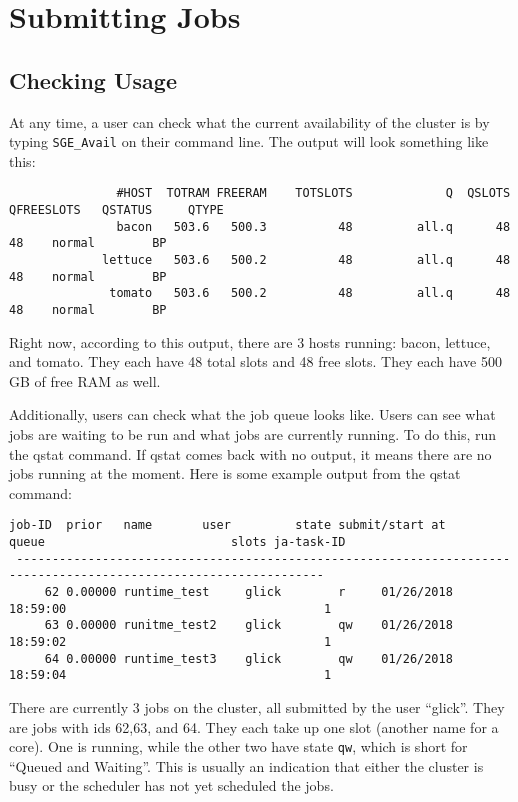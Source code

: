 \documentclass[]{book}
\begin{document}
\chapter{Submitting Jobs}\label{submitting-jobs}

\section{Checking Usage}\label{checking-usage}

At any time, a user can check what the current availability of the
cluster is by typing \texttt{SGE\_Avail} on their command line. The
output will look something like this:

\begin{verbatim}
               #HOST  TOTRAM FREERAM    TOTSLOTS             Q  QSLOTS  QFREESLOTS   QSTATUS     QTYPE
               bacon   503.6   500.3          48         all.q      48          48    normal        BP
             lettuce   503.6   500.2          48         all.q      48          48    normal        BP
              tomato   503.6   500.2          48         all.q      48          48    normal        BP
\end{verbatim}

Right now, according to this output, there are 3 hosts running: bacon,
lettuce, and tomato. They each have 48 total slots and 48 free slots.
They each have 500 GB of free RAM as well.

Additionally, users can check what the job queue looks like. Users can
see what jobs are waiting to be run and what jobs are currently running.
To do this, run the qstat command. If qstat comes back with no output,
it means there are no jobs running at the moment. Here is some example
output from the qstat command:

\begin{verbatim}
job-ID  prior   name       user         state submit/start at     queue                          slots ja-task-ID 
 -----------------------------------------------------------------------------------------------------------------
     62 0.00000 runtime_test     glick        r     01/26/2018 18:59:00                                    1        
     63 0.00000 runitme_test2    glick        qw    01/26/2018 18:59:02                                    1        
     64 0.00000 runtime_test3    glick        qw    01/26/2018 18:59:04                                    1    
\end{verbatim}

There are currently 3 jobs on the cluster, all submitted by the user
``glick''. They are jobs with ids 62,63, and 64. They each take up one
slot (another name for a core). One is running, while the other two have
state \texttt{qw}, which is short for ``Queued and Waiting''. This is
usually an indication that either the cluster is busy or the scheduler
has not yet scheduled the jobs.
\end{document}
